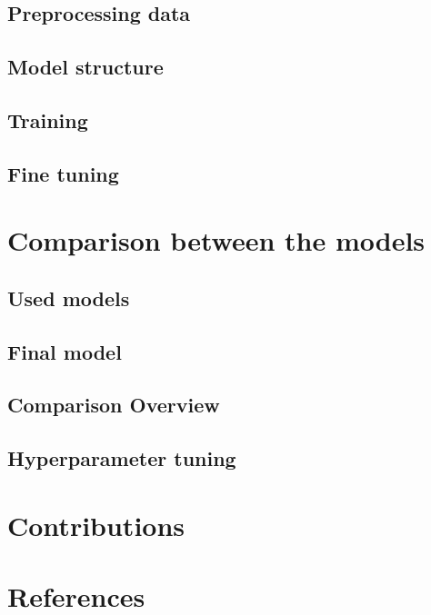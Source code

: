 \documentclass{article}
\begin{document}
\subsection{Preprocessing data}
\subsection{Model structure}
\subsection{Training}
\subsection{Fine tuning}

\section{Comparison between the models}
\subsection{Used models}
\subsection{Final model}
\subsection{Comparison Overview}
\subsection{Hyperparameter tuning}

\section{Contributions}

\section{References}
\end{document}
